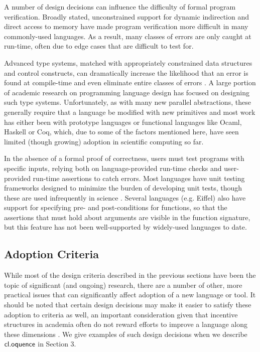 \documentclass{llncs}
\begin{document}
A number of design decisions can influence the difficulty of formal program verification. Broadly stated, unconstrained support for dynamic indirection and direct access to memory have made program verification more difficult in many commonly-used languages. As a result, many classes of errors are only caught at run-time, often due to edge cases that are difficult to test for.

Advanced type systems, matched with appropriately constrained data structures and control constructs, can dramatically increase the likelihood that an error is found at compile-time and even eliminate entire classes of errors \cite{tapl}. A large portion of academic research on programming language design has focused on designing such type systems. Unfortunately, as with many new parallel abstractions, these generally require that a language be modified with new primitives and most work has either been with prototype languages or functional languages like Ocaml, Haskell or Coq, which, due to some of the factors mentioned here, have seen  limited (though growing) adoption in scientific computing so far.

In the absence of a formal proof of correctness, users must test programs with specific inputs, relying both on language-provided run-time checks and user-provided run-time assertions to catch errors. Most languages have unit testing frameworks designed to minimize the burden of developing unit tests, though these are used infrequently in science \cite{oai:open.ac.uk.OAI2:17673}\cite{hannay2009scientists}. Several languages (e.g. Eiffel) also have support for specifying pre- and post-conditions for functions, so that the assertions that must hold about arguments are visible in the function signature, but this feature has not been well-supported by widely-used languages to date.

\subsection{Adoption Criteria}
While most of the design criteria described in the previous sections have been the topic of significant (and ongoing) research, there are a number of other, more practical issues that can significantly affect adoption of a new language or tool. It should be noted that certain design decisions may make it easier to satisfy these adoption to criteria as well, an important consideration given that incentive structures in academia often do not reward efforts to improve a language along these dimensions \cite{howison2011scientific}. We give examples of such design decisions when we describe $\textsf{cl.oquence}$ in Section 3.
\end{document}
